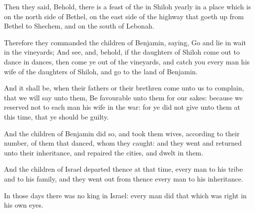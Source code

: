 \verse Then they said, Behold, there is a feast of the \LORD in Shiloh yearly in a place which is on the north side of Bethel, on the east side of the highway that goeth up from Bethel to Shechem, and on the south of Lebonah.

\verse Therefore they commanded the children of Benjamin, saying, Go and lie in wait in the vineyards; \verse And see, and, behold, if the daughters of Shiloh come out to dance in dances, then come ye out of the vineyards, and catch you every man his wife of the daughters of Shiloh, and go to the land of Benjamin.

\verse And it shall be, when their fathers or their brethren come unto us to complain, that we will say unto them, Be favourable unto them for our sakes: because we reserved not to each man his wife in the war: for ye did not give unto them at this time, that ye should be guilty.

\verse And the children of Benjamin did so, and took them wives, according to their number, of them that danced, whom they caught: and they went and returned unto their inheritance, and repaired the cities, and dwelt in them.

\verse And the children of Israel departed thence at that time, every man to his tribe and to his family, and they went out from thence every man to his inheritance.

\verse In those days there was no king in Israel: every man did that which was right in his own eyes.

